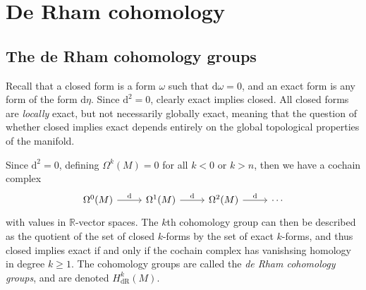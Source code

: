 \chapter{De Rham cohomology}


\section{The de Rham cohomology groups}

Recall that a closed form is a form $\omega $ such that $\mathrm{d} \omega =0$, and an exact form is any form of the form $\mathrm{d} \eta $. Since $\mathrm{d} ^2=0$, clearly exact implies closed. All closed forms are \emph{locally} exact, but not necessarily globally exact, meaning that the question of whether closed implies exact depends entirely on the global topological properties of the manifold.

Since $\mathrm{d} ^2=0$, defining $\Omega ^k(M)=0$ for all $k<0$ or $k>n$, then we have a cochain complex
\[\begin{tikzcd}[row sep = 2.5em, column sep = 2.5em]
\Omega ^0(M)\ar[" \mathrm{d}  ", r]  & \Omega ^1(M)\ar[" \mathrm{d}  ", r]  & \Omega ^2(M)\ar[" \mathrm{d}  ", r]  & \cdots
\end{tikzcd}\]
with values in $\mathbb{R} $-vector spaces. The $k$th cohomology group can then be described as the quotient of the set of closed $k$-forms by the set of exact $k$-forms, and thus closed implies exact if and only if the cochain complex has vanishsing homology in degree $k\geq 1$. The cohomology groups are called the \emph{de Rham cohomology groups}, and are denoted $H_{\mathrm{dR} } ^k(M)$.


